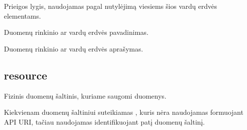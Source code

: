 \documentclass[letterpaper,10pt,lithuanian]{sphinxmanual}
\begin{document}

\begin{fulllineitems}
\label{\detokenize{dimensijos:dataset.access}}
\pysigstartsignatures
\pysigline
{}
\pysigstopsignatures
\sphinxAtStartPar
Prieigos lygis, naudojamas pagal nutylėjimą viesiems šios vardų erdvės
elementams.

\end{fulllineitems}


\begin{fulllineitems}
\label{\detokenize{dimensijos:dataset.title}}
\pysigstartsignatures
\pysigline
{}
\pysigstopsignatures
\sphinxAtStartPar
Duomenų rinkinio ar vardų erdvės pavadinimas.

\end{fulllineitems}


\begin{fulllineitems}
\label{\detokenize{dimensijos:dataset.description}}
\pysigstartsignatures
\pysigline
{}
\pysigstopsignatures
\sphinxAtStartPar
Duomenų rinkinio ar vardų erdvės aprašymas.

\end{fulllineitems}



\subsection{resource}
\label{\detokenize{dimensijos:resource}}\label{\detokenize{dimensijos:id3}}\label{\detokenize{dimensijos:module-resource}}
\sphinxAtStartPar
Fizinis duomenų šaltinis, kuriame saugomi duomenys.

\sphinxAtStartPar
Kiekvienam duomenų šaltiniui suteikiamas , kuris nėra naudojamas formuojant API URI, tačiau naudojamas
identifikuojant patį duomenų šaltinį.
\end{document}

